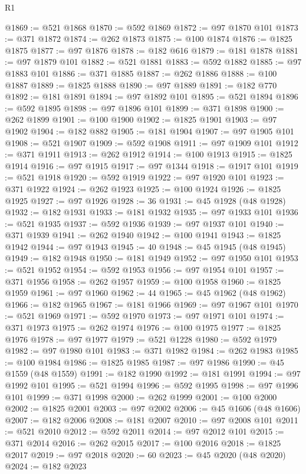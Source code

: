 \begin{lexlean}{R1}
\begin{coremodule}
@1869 := @521 @1868
@1870 := @592 @1869
@1872 := @97 @1870 @101
@1873 := @371 @1872
@1874 := @262 @1873
@1875 := @100 @1874
@1876 := @1825 @1875
@1877 := @97 @1876
@1878 := @182 @616
@1879 := @181 @1878
@1881 := @97 @1879 @101
@1882 := @521 @1881
@1883 := @592 @1882
@1885 := @97 @1883 @101
@1886 := @371 @1885
@1887 := @262 @1886
@1888 := @100 @1887
@1889 := @1825 @1888
@1890 := @97 @1889
@1891 := @182 @770
@1892 := @181 @1891
@1894 := @97 @1892 @101
@1895 := @521 @1894
@1896 := @592 @1895
@1898 := @97 @1896 @101
@1899 := @371 @1898
@1900 := @262 @1899
@1901 := @100 @1900
@1902 := @1825 @1901
@1903 := @97 @1902
@1904 := @182 @882
@1905 := @181 @1904
@1907 := @97 @1905 @101
@1908 := @521 @1907
@1909 := @592 @1908
@1911 := @97 @1909 @101
@1912 := @371 @1911
@1913 := @262 @1912
@1914 := @100 @1913
@1915 := @1825 @1914
@1916 := @97 @1915
@1917 := @97 @1344
@1918 := @1917 @101
@1919 := @521 @1918
@1920 := @592 @1919
@1922 := @97 @1920 @101
@1923 := @371 @1922
@1924 := @262 @1923
@1925 := @100 @1924
@1926 := @1825 @1925
@1927 := @97 @1926
@1928 := 36
@1931 := @45 @1928 (@48 @1928)
@1932 := @182 @1931
@1933 := @181 @1932
@1935 := @97 @1933 @101
@1936 := @521 @1935
@1937 := @592 @1936
@1939 := @97 @1937 @101
@1940 := @371 @1939
@1941 := @262 @1940
@1942 := @100 @1941
@1943 := @1825 @1942
@1944 := @97 @1943
@1945 := 40
@1948 := @45 @1945 (@48 @1945)
@1949 := @182 @1948
@1950 := @181 @1949
@1952 := @97 @1950 @101
@1953 := @521 @1952
@1954 := @592 @1953
@1956 := @97 @1954 @101
@1957 := @371 @1956
@1958 := @262 @1957
@1959 := @100 @1958
@1960 := @1825 @1959
@1961 := @97 @1960
@1962 := 44
@1965 := @45 @1962 (@48 @1962)
@1966 := @182 @1965
@1967 := @181 @1966
@1969 := @97 @1967 @101
@1970 := @521 @1969
@1971 := @592 @1970
@1973 := @97 @1971 @101
@1974 := @371 @1973
@1975 := @262 @1974
@1976 := @100 @1975
@1977 := @1825 @1976
@1978 := @97 @1977
@1979 := @521 @1228
@1980 := @592 @1979
@1982 := @97 @1980 @101
@1983 := @371 @1982
@1984 := @262 @1983
@1985 := @100 @1984
@1986 := @1825 @1985
@1987 := @97 @1986
@1990 := @45 @1559 (@48 @1559)
@1991 := @182 @1990
@1992 := @181 @1991
@1994 := @97 @1992 @101
@1995 := @521 @1994
@1996 := @592 @1995
@1998 := @97 @1996 @101
@1999 := @371 @1998
@2000 := @262 @1999
@2001 := @100 @2000
@2002 := @1825 @2001
@2003 := @97 @2002
@2006 := @45 @1606 (@48 @1606)
@2007 := @182 @2006
@2008 := @181 @2007
@2010 := @97 @2008 @101
@2011 := @521 @2010
@2012 := @592 @2011
@2014 := @97 @2012 @101
@2015 := @371 @2014
@2016 := @262 @2015
@2017 := @100 @2016
@2018 := @1825 @2017
@2019 := @97 @2018
@2020 := 60
@2023 := @45 @2020 (@48 @2020)
@2024 := @182 @2023

\end{coremodule}
\end{lexlean}

